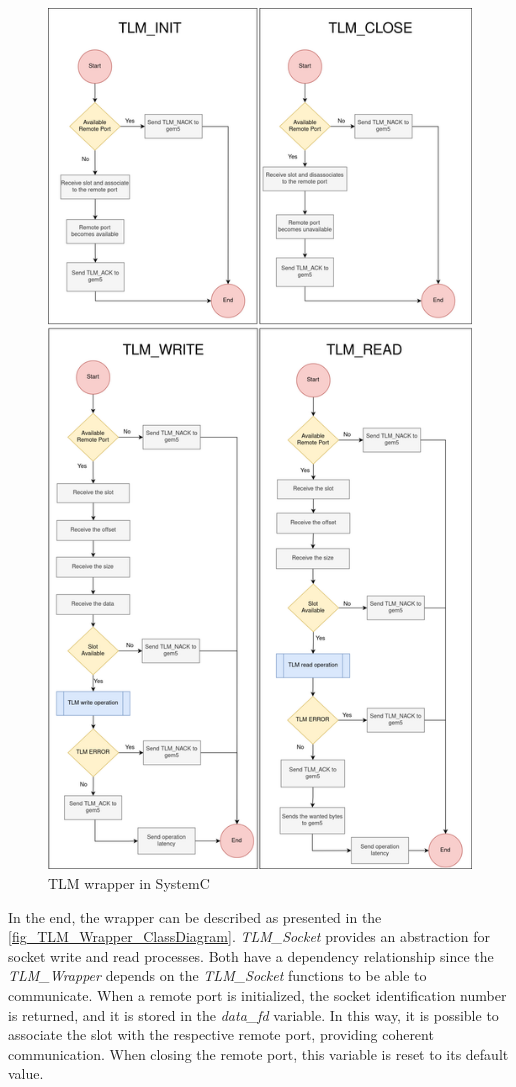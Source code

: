 \begin{figure}[H]
	\centering
 	\includegraphics[width=0.7\linewidth]{Images/TLMWrapper_SystemC.png} 
 	\caption{TLM wrapper in SystemC}
\end{figure}

In the end, the wrapper can be described as presented in the \autoref{fig_TLM_Wrapper_ClassDiagram}. \textit{TLM\_Socket} \space provides an abstraction 
for socket write and read processes. Both have a dependency relationship since the \textit{TLM\_Wrapper} depends on the 
\textit{TLM\_Socket} \space functions to be able to communicate. When a remote port is initialized, the socket identification number is returned, 
and it is stored in the \textit{data\_fd} \space variable. In this way, it is possible to associate the slot with the respective remote port, providing 
coherent communication. When closing the remote port, this variable is reset to its default value. 

